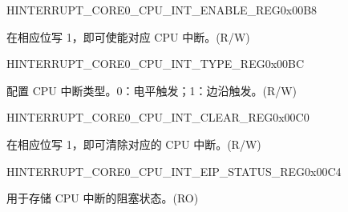 \begin{register}{H}{INTERRUPT\_CORE0\_CPU\_INT\_ENABLE\_REG}{0x00B8}\label{regdesc:INTERRUPTCORE0CPUINTENABLEREG}
%
\regnewline%
\begin{regdesc}\begin{reglist}
\label{fielddesc:INTERRUPTCORE0CPUINTENABLE}\item [INTERRUPT\_CORE0\_CPU\_INT\_ENABLE] 在相应位写 1，即可使能对应 CPU 中断。(R/W)
\end{reglist}\end{regdesc}
\end{register}


\begin{register}{H}{INTERRUPT\_CORE0\_CPU\_INT\_TYPE\_REG}{0x00BC}\label{regdesc:INTERRUPTCORE0CPUINTTYPEREG}
%
\regnewline%
\begin{regdesc}\begin{reglist}
\label{fielddesc:INTERRUPTCORE0CPUINTTYPE}\item [INTERRUPT\_CORE0\_CPU\_INT\_TYPE] 配置 CPU 中断类型。0：电平触发；1：边沿触发。(R/W)
\end{reglist}\end{regdesc}
\end{register}


\begin{register}{H}{INTERRUPT\_CORE0\_CPU\_INT\_CLEAR\_REG}{0x00C0}\label{regdesc:INTERRUPTCORE0CPUINTCLEARREG}
%
\regnewline%
\begin{regdesc}\begin{reglist}
\label{fielddesc:INTERRUPTCORE0CPUINTCLEAR}\item [INTERRUPT\_CORE0\_CPU\_INT\_CLEAR] 在相应位写 1，即可清除对应的 CPU 中断。(R/W)
\end{reglist}\end{regdesc}
\end{register}


\begin{register}{H}{INTERRUPT\_CORE0\_CPU\_INT\_EIP\_STATUS\_REG}{0x00C4}\label{regdesc:INTERRUPTCORE0CPUINTEIPSTATUSREG}
%
\regnewline%
\begin{regdesc}\begin{reglist}
\label{fielddesc:INTERRUPTCORE0CPUINTEIPSTATUS}\item [INTERRUPT\_CORE0\_CPU\_INT\_EIP\_STATUS] 用于存储 CPU 中断的阻塞状态。(RO)
\end{reglist}\end{regdesc}
\end{register}


